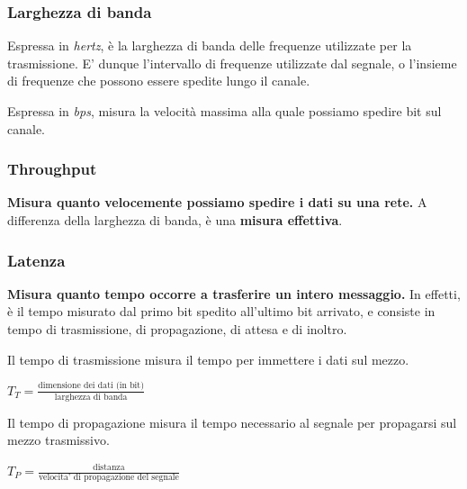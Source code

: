         \subsubsection{Larghezza di banda}
        
            Espressa in \textit{hertz}, è la larghezza di banda delle frequenze utilizzate per la trasmissione. E' dunque l'intervallo di frequenze utilizzate dal segnale, o l'insieme di frequenze che possono essere spedite lungo il canale.
            
            Espressa in \textit{bps}, misura la velocità massima alla quale possiamo spedire bit sul canale.
            
        \subsubsection{Throughput}
        
            \textbf{Misura quanto velocemente possiamo spedire i dati su una rete.} A differenza della larghezza di banda, è una \textbf{misura effettiva}.
            
        \subsubsection{Latenza}
        
            \textbf{Misura quanto tempo occorre a trasferire un intero messaggio.} In effetti, è il tempo misurato dal primo bit spedito  all'ultimo bit arrivato, e consiste in tempo di trasmissione, di propagazione, di attesa e di inoltro.
            
            \vspace{3mm}
            
            Il tempo di trasmissione misura il tempo per immettere i dati sul mezzo.
            
            \begin{center}
                \(T_T = \frac{\text{dimensione dei dati (in bit)}}{\text{larghezza di banda}}\)
            \end{center}
            
            Il tempo di propagazione misura il tempo necessario al segnale per propagarsi sul mezzo trasmissivo.
            
            \begin{center}
                \(T_P = \frac{\text{distanza}}{\text{velocita' di propagazione del segnale}}\)
            \end{center}
            
